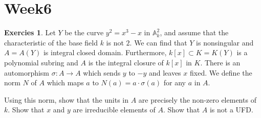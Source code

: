 \documentclass[12pt,a4paper]{article}
\theoremstyle{definition}
\newtheorem{exer}{Exercies}[section]
\begin{document}
\section{Week6}
\begin{exer}
	Let $Y$ be the curve $y^2= x^3-x$ in $\mathbb{A}_k^2$, and assume that the characteristic of the base field $k$ is not $2$. We can find that $Y$ is nonsingular and $A= A(Y)$ is integral closed domain. Furthermore, $k[x] \subset K=K(Y)$ is a polynomial subring and $A$ is the integral closure of $k[x]$ in $K$. There is an automorphism $\sigma:A \to A$ which sends $y$ to $-y$ and leaves $x$ fixed. We define the norm $N$ of $A$ which maps $a$ to $N(a) = a \cdot \sigma(a)$ for any $a$ in $A$. 
	
	Using this norm, show that the units in $A$ are precisely the non-zero elements of $k$. Show that $x$ and $y$ are irreducible elements of $A$. Show that $A$ is not a UFD.
\end{exer}
\end{document}
